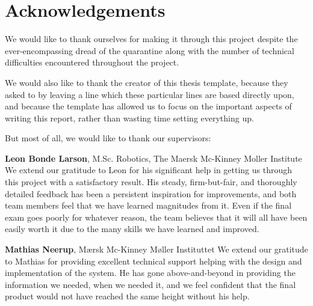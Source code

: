 \section*{Acknowledgements}
\textbf{\authors} \newline

We would like to thank ourselves for making it through this project despite the ever-encompassing dread of the quarantine along with the number of technical difficulties encountered throughout the project.

We would also like to thank the creator of this thesis template, because they asked to by leaving a line which these particular lines are based directly upon, and because the template has allowed us to focus on the important aspects of writing this report, rather than wasting time setting everything up.

But most of all, we would like to thank our supervisors:

\textbf{Leon Bonde Larson}, M.Sc. Robotics, The Maersk Mc-Kinney Moller Institute \newline
We extend our gratitude to Leon for his significant help in getting us through this project with a satisfactory result. His steady, firm-but-fair, and thoroughly detailed feedback has been a persistent inspiration for improvements, and both team members feel that we have learned magnitudes from it. Even if the final exam goes poorly for whatever reason, the team believes that it will all have been easily worth it due to the many skills we have learned and improved.

\textbf{Mathias Neerup}, Mærsk Mc-Kinney Møller Instituttet \newline
We extend our gratitude to Mathias for providing excellent technical support helping with the design and implementation of the system. He has gone above-and-beyond in providing the information we needed, when we needed it, and we feel confident that the final product would not have reached the same height without his help.

